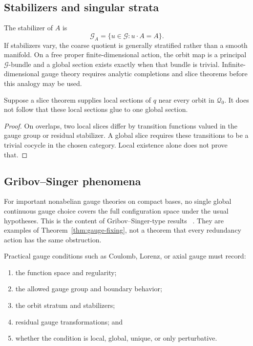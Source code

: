 \documentclass[11pt]{article}
\newcommand{\Gg}{\mathcal G}
\newcommand{\Orb}{\mathcal Q}
\begin{document}
\subsection{Stabilizers and singular strata}

The stabilizer of $A$ is
\[
 \Gg_A=\{u\in\Gg:u\cdot A=A\}.
\]
If stabilizers vary, the coarse quotient is generally stratified rather than a
smooth manifold.  On a free proper finite-dimensional action, the orbit map is
a principal $\Gg$-bundle and a global section exists exactly when that
bundle is trivial.  Infinite-dimensional gauge theory requires analytic
completions and slice theorems before this analogy may be used.

\begin{proposition}
\label{prop:local-global}
Suppose a slice theorem supplies local sections of $q$ near every orbit in
$\Orb_0$.  It does not follow that these local sections glue to one global
section.
\end{proposition}

\begin{proof}
On overlaps, two local slices differ by transition functions valued in the
gauge group or residual stabilizer.  A global slice requires these transitions
to be a trivial cocycle in the chosen category.  Local existence alone does
not prove that.
\end{proof}

\subsection{Gribov--Singer phenomena}

For important nonabelian gauge theories on compact bases, no single global
continuous gauge choice covers the full configuration space under the usual
hypotheses.  This is the content of Gribov--Singer-type results
~\cite{Gribov,Singer}.  They are examples of
Theorem~\ref{thm:gauge-fixing}, not a theorem that every redundancy action has
the same obstruction.

Practical gauge conditions such as Coulomb, Lorenz, or axial gauge must record:
\begin{enumerate}
\item the function space and regularity;
\item the allowed gauge group and boundary behavior;
\item the orbit stratum and stabilizers;
\item residual gauge transformations; and
\item whether the condition is local, global, unique, or only perturbative.
\end{enumerate}
\end{document}
